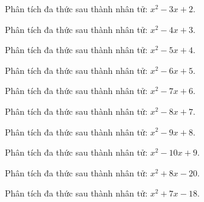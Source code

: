 \begin{bt}
	Phân tích đa thức sau thành nhân tử: $x^2 - 3 x + 2$.
\end{bt}
\begin{bt}
	Phân tích đa thức sau thành nhân tử: $x^2 - 4 x + 3$.
\end{bt}
\begin{bt}
	Phân tích đa thức sau thành nhân tử: $x^2 - 5 x + 4$.
\end{bt}
\begin{bt}
	Phân tích đa thức sau thành nhân tử: $x^2 - 6 x + 5$.
\end{bt}
\begin{bt}
	Phân tích đa thức sau thành nhân tử: $x^2 - 7 x + 6$.
\end{bt}
\begin{bt}
	Phân tích đa thức sau thành nhân tử: $x^2 - 8 x + 7$.
\end{bt}
\begin{bt}
	Phân tích đa thức sau thành nhân tử: $x^2 - 9 x + 8$.
\end{bt}
\begin{bt}
	Phân tích đa thức sau thành nhân tử: $x^2 - 10 x + 9$.
\end{bt}
\begin{bt}
	Phân tích đa thức sau thành nhân tử: $x^2 + 8 x - 20$.
\end{bt}
\begin{bt}
	Phân tích đa thức sau thành nhân tử: $x^2 + 7 x - 18$.
\end{bt}
